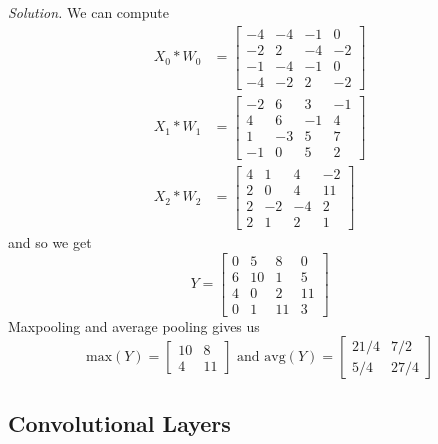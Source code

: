 \documentclass{article}
\theoremstyle{definition}
\theoremstyle{remark}
\theoremstyle{definition}
\newenvironment{solution}{\noindent \textit{Solution.}}{}
\begin{document}
\begin{solution}
We can compute 
\begin{align*} 
    X_0 \ast  W_0 & = \begin{bmatrix} -4 & -4 & -1 & 0 \\ -2 & 2 & -4 & -2 \\ -1 & -4 & -1 & 0 \\ -4 & -2 & 2 & -2 \end{bmatrix} \\
    X_1 \ast W_1 & = \begin{bmatrix} -2 & 6 & 3 & -1 \\ 4 & 6 & -1 & 4 \\ 1 & -3 & 5 & 7 \\ -1 & 0 & 5 & 2 \end{bmatrix} \\
    X_2 \ast W_2 & = \begin{bmatrix} 4 & 1 & 4 & -2 \\ 2 & 0 & 4 & 11 \\ 2 & -2 & -4 & 2 \\ 2 & 1 & 2 & 1 \end{bmatrix}
\end{align*}
and so we get 
\[Y = \begin{bmatrix} 0 & 5 & 8 & 0 \\ 6 & 10 & 1 & 5 \\ 4 &  0 & 2 & 11 \\ 0 & 1 & 11 & 3 \end{bmatrix}\]
Maxpooling and average pooling gives us 
\[\mathrm{max}(Y) = \begin{bmatrix} 10 & 8 \\ 4 & 11 \end{bmatrix} \text{ and } \mathrm{avg}(Y) = \begin{bmatrix} 21/4 & 7/2 \\ 5/4 & 27/4 \end{bmatrix}\]
\end{solution}

\subsection{Convolutional Layers}
\end{document}
